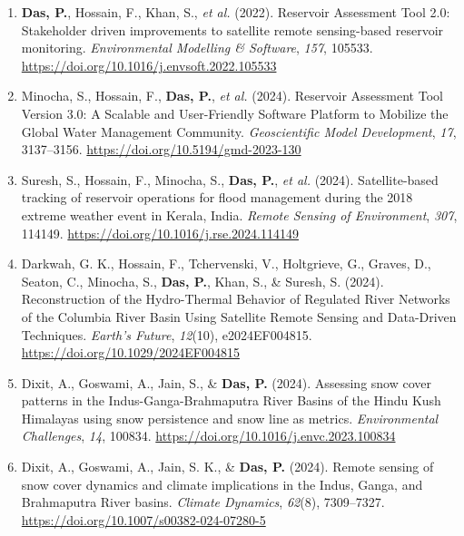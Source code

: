 \documentclass[a4paper,9pt]{extarticle}
\begin{document}
\begin{enumerate}
        \item \textbf{Das, P.}, Hossain, F., Khan, S., \textit{et al.} (2022). Reservoir Assessment Tool 2.0: Stakeholder driven improvements to satellite remote sensing-based reservoir monitoring. \textit{Environmental Modelling \& Software}, \textit{157}, 105533. \href{https://doi.org/10.1016/j.envsoft.2022.105533}{https://doi.org/10.1016/j.envsoft.2022.105533}

        \item Minocha, S., Hossain, F., \textbf{Das, P.}, \textit{et al.} (2024). Reservoir Assessment Tool Version 3.0: A Scalable and User-Friendly Software Platform to Mobilize the Global Water Management Community. \textit{Geoscientific Model Development}, \textit{17}, 3137--3156. \href{https://doi.org/10.5194/gmd-2023-130}{https://doi.org/10.5194/gmd-2023-130}

        \item Suresh, S., Hossain, F., Minocha, S., \textbf{Das, P.}, \textit{et al.} (2024). Satellite-based tracking of reservoir operations for flood management during the 2018 extreme weather event in Kerala, India. \textit{Remote Sensing of Environment}, \textit{307}, 114149. \href{https://doi.org/10.1016/j.rse.2024.114149}{https://doi.org/10.1016/j.rse.2024.114149}

        \item Darkwah, G. K., Hossain, F., Tchervenski, V., Holtgrieve, G., Graves, D., Seaton, C., Minocha, S., \textbf{Das, P.}, Khan, S., \& Suresh, S. (2024). Reconstruction of the Hydro-Thermal Behavior of Regulated River Networks of the Columbia River Basin Using Satellite Remote Sensing and Data-Driven Techniques. \textit{Earth's Future}, \textit{12}(10), e2024EF004815. \href{https://doi.org/10.1029/2024EF004815}{https://doi.org/10.1029/2024EF004815}

        \item Dixit, A., Goswami, A., Jain, S., \& \textbf{Das, P.} (2024). Assessing snow cover patterns in the Indus-Ganga-Brahmaputra River Basins of the Hindu Kush Himalayas using snow persistence and snow line as metrics. \textit{Environmental Challenges}, \textit{14}, 100834. \href{https://doi.org/10.1016/j.envc.2023.100834}{https://doi.org/10.1016/j.envc.2023.100834}

        \item Dixit, A., Goswami, A., Jain, S. K., \& \textbf{Das, P.} (2024). Remote sensing of snow cover dynamics and climate implications in the Indus, Ganga, and Brahmaputra River basins. \textit{Climate Dynamics}, \textit{62}(8), 7309--7327. \href{https://doi.org/10.1007/s00382-024-07280-5}{https://doi.org/10.1007/s00382-024-07280-5}


\end{enumerate}
\end{document}
